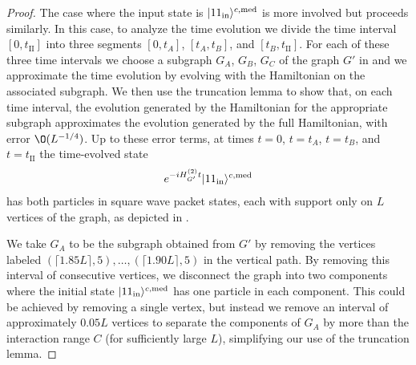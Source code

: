 \documentclass[../thesis-main/thesis-main]{subfiles}
\begin{document}
\begin{proof}
The case where the input state is $|11_{\text{in}}\rangle^{c,\text{med}}$ is more involved but proceeds similarly. In this case, to analyze the time evolution we divide the time interval $[0,t_{\mathrm{II}}]$ into three segments $[0,t_{A}]$, $[t_{A},t_{B}]$, and $[t_{B},t_{\mathrm{II}}]$. For each of these three time intervals we choose a subgraph $G_{A}$, $G_{B}$, $G_C$ of the graph $G'$ in  and we approximate the time evolution by evolving with the Hamiltonian on the associated subgraph. We then use the truncation lemma to show that, on each time interval, the evolution generated by the Hamiltonian for the appropriate subgraph approximates the evolution generated by the full Hamiltonian, with error $\O(L^{-{1}/{4}})$. Up to these error terms, at times $t=0$, $t=t_A$, $t=t_B$, and $t=t_{\mathrm{II}}$ the time-evolved state 
\begin{align}
e^{-iH_{G'}^{(2)}t}|11_{\text{in}}\rangle^{c,\text{med}}
\end{align}
has both particles in square wave packet states, each with support only on $L$ vertices of the graph, as depicted in .

We take $G_A$ to be the subgraph obtained from $G'$ by removing the vertices labeled $(\lceil 1.85L\rceil,5)\allowbreak, \ldots,\allowbreak (\lceil 1.90 L\rceil,5)$ in the vertical path. By removing this interval of consecutive vertices, we disconnect the graph into two components where the initial state $|11_{\text{in}}\rangle^{c,\text{med}}$ has one particle in each component. This could be achieved by removing a single vertex, but instead we remove an interval of approximately $0.05L$ vertices to separate the components of $G_A$ by more than the interaction range $C$ (for sufficiently large $L$), simplifying our use of the truncation lemma.


\end{proof}
\end{document}
